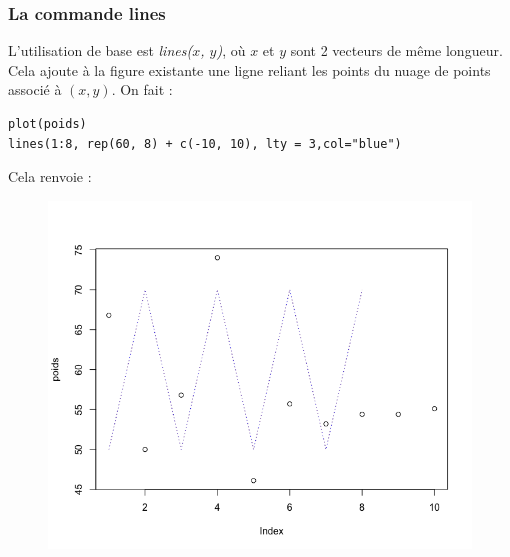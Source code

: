 \subsubsection{La commande lines}
L'utilisation de base est \textit{lines($x$, $y$)}, où $x$ et $y$ sont 2 vecteurs de même longueur. Cela ajoute à la figure existante une ligne reliant les points du nuage de points associé à $(x, y)$.\newline
On fait :
\begin{lstlisting}[language=html]
plot(poids)
lines(1:8, rep(60, 8) + c(-10, 10), lty = 3,col="blue")
\end{lstlisting}
Cela renvoie :
\begin{figure}[H]\begin{center}\includegraphics[scale=0.4]{ilu/gra55.png}\end{center}\end{figure}
